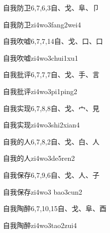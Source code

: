 \begin{entry}{自我防卫}{6,7,6,3}{⾃、⼽、⾩、⼙}
  \begin{phonetics}{自我防卫}{zi4wo3fang2wei4}
  \end{phonetics}
\end{entry}

\begin{entry}{自我吹嘘}{6,7,7,14}{⾃、⼽、⼝、⼝}
  \begin{phonetics}{自我吹嘘}{zi4wo3chui1xu1}
  \end{phonetics}
\end{entry}

\begin{entry}{自我批评}{6,7,7,7}{⾃、⼽、⼿、⾔}
  \begin{phonetics}{自我批评}{zi4wo3pi1ping2}
  \end{phonetics}
\end{entry}

\begin{entry}{自我实现}{6,7,8,8}{⾃、⼽、⼧、⾒}
  \begin{phonetics}{自我实现}{zi4wo3shi2xian4}
  \end{phonetics}
\end{entry}

\begin{entry}{自我的人}{6,7,8,2}{⾃、⼽、⽩、⼈}
  \begin{phonetics}{自我的人}{zi4wo3de5ren2}
  \end{phonetics}
\end{entry}

\begin{entry}{自我保存}{6,7,9,6}{⾃、⼽、⼈、⼦}
  \begin{phonetics}{自我保存}{zi4wo3 bao3cun2}
  \end{phonetics}
\end{entry}

\begin{entry}{自我陶醉}{6,7,10,15}{⾃、⼽、⾩、⾣}
  \begin{phonetics}{自我陶醉}{zi4wo3tao2zui4}
  \end{phonetics}
\end{entry}

